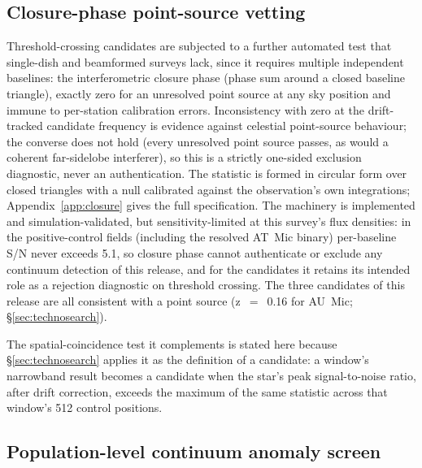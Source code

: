 \documentclass{openjournal}
\begin{document}
\subsection{Closure-phase point-source vetting}
\label{sec:closurephase}

Threshold-crossing candidates are subjected to a further automated
test that single-dish and beamformed surveys lack, since it requires
multiple independent baselines: the interferometric closure phase
(phase sum around a closed baseline triangle), exactly zero for an
unresolved point source at any sky position and immune to per-station
calibration errors. Inconsistency with zero at the drift-tracked
candidate frequency is evidence against celestial point-source
behaviour; the converse does not hold (every unresolved point source
passes, as would a coherent far-sidelobe interferer), so this is a
strictly one-sided exclusion diagnostic, never an authentication. The
statistic is formed in circular form over closed triangles with a
null calibrated against the observation's own integrations;
Appendix~\ref{app:closure} gives the full specification. The machinery
is implemented and simulation-validated, but sensitivity-limited at
this survey's flux densities: in the positive-control fields
(including the resolved AT~Mic binary) per-baseline S/N never exceeds
5.1, so closure phase cannot authenticate or exclude any continuum
detection of this release, and for the candidates it retains its
intended role as a rejection diagnostic on threshold crossing. The
three candidates of this release are all consistent with a point
source (z~$=$~0.16 for AU~Mic; \S\ref{sec:technosearch}).

The spatial-coincidence test it complements is stated here because
\S\ref{sec:technosearch} applies it as the definition of a candidate:
a window's narrowband result becomes a candidate when the star's peak
signal-to-noise ratio, after drift correction, exceeds the maximum of
the same statistic across that window's 512 control positions.

\subsection{Population-level continuum anomaly screen}
\label{sec:popanomaly}
\end{document}
